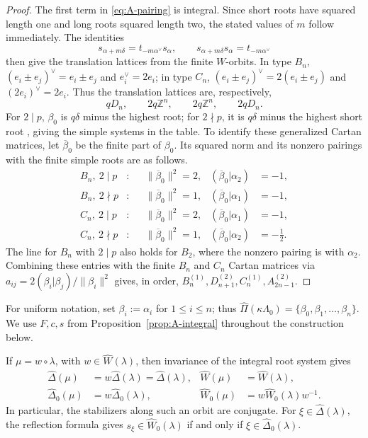 \documentclass[11pt,a4paper]{amsart}
\newcommand{\ZZ}{\mathbb Z}
\theoremstyle{plain}
\numberwithin{equation}{section}
\def\leq{\leqslant}
\newenvironment{pf}{\begin{proof}}{\end{proof}}
\begin{document}
\begin{pf}
The first term in \eqref{eq:A-pairing} is integral. Since short roots
have squared length one and long roots squared length two, the stated
values of \(m\) follow immediately. The identities
\[
s_{\alpha+m\delta}=t_{-m\alpha^\vee}s_\alpha,
\qquad s_{\alpha+m\delta}s_\alpha=t_{-m\alpha^\vee}
\]
then give the translation lattices from the finite $W$-orbits. In type
$B_n$, $(e_i\pm e_j)^\vee=e_i\pm e_j$ and $e_i^\vee=2e_i$; in type
$C_n$, $(e_i\pm e_j)^\vee=2(e_i\pm e_j)$ and $(2e_i)^\vee=2e_i$.
Thus the translation lattices are, respectively,
\[
qD_n,\qquad 2q\ZZ^n,\qquad 2q\ZZ^n,\qquad 2qD_n.
\]
For \(2\mid p\), \(\beta_0\) is \(q\delta\) minus the highest root;
for \(2\nmid p\), it is \(q\delta\) minus the highest short root
\cite[\S2]{KT00}, giving the simple systems in the table.
To identify these generalized Cartan matrices, let
\(\overline\beta_0\) be the finite part of \(\beta_0\).
Its squared norm and its nonzero pairings with the finite simple
roots are as follows.
\[
\begin{aligned}
B_n,\ 2\mid p &:&&
\|\overline\beta_0\|^2=2,&
(\overline\beta_0|\alpha_2)&=-1,\\
B_n,\ 2\nmid p &:&&
\|\overline\beta_0\|^2=1,&
(\overline\beta_0|\alpha_1)&=-1,\\
C_n,\ 2\mid p &:&&
\|\overline\beta_0\|^2=2,&
(\overline\beta_0|\alpha_1)&=-1,\\
C_n,\ 2\nmid p &:&&
\|\overline\beta_0\|^2=1,&
(\overline\beta_0|\alpha_2)&=-\tfrac12.
\end{aligned}
\]
The line for \(B_n\) with \(2\mid p\) also holds for \(B_2\),
where the nonzero pairing is with \(\alpha_2\).
Combining these entries with the finite \(B_n\) and \(C_n\) Cartan
matrices via
\(a_{ij}=2(\beta_i|\beta_j)/\|\beta_i\|^2\) gives, in order,
\(B_n^{(1)},D_{n+1}^{(2)},C_n^{(1)},A_{2n-1}^{(2)}\).
\end{pf}

For uniform notation, set $\beta_i:=\alpha_i$ for $1\leq i\leq n$; thus
\(\widehat\Pi(\kappa\Lambda_0)=\{\beta_0,\beta_1,\ldots,\beta_n\}\).
We use \(F,c,s\) from Proposition~\ref{prop:A-integral} throughout
the construction below.

If \(\mu=w\circ\lambda\), with \(w\in\widehat W(\lambda)\),
then invariance of the integral root system gives
\begin{equation}\label{eq:A-orbit-systems}
\begin{aligned}
\widehat\Delta(\mu)&=w\widehat\Delta(\lambda)
=\widehat\Delta(\lambda),&
\widehat W(\mu)&=\widehat W(\lambda),\\
\widehat\Delta_0(\mu)&=w\widehat\Delta_0(\lambda),&
\widehat W_0(\mu)&=w\widehat W_0(\lambda)w^{-1}.
\end{aligned}
\end{equation}
In particular, the stabilizers along such an orbit are conjugate.
For \(\xi\in\widehat\Delta(\lambda)\), the reflection formula gives
\(s_\xi\in\widehat W_0(\lambda)\) if and only if
\(\xi\in\widehat\Delta_0(\lambda)\).
\end{document}
